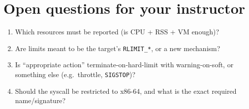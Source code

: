 \documentclass[11pt,a4paper]{article}
\begin{document}
\section*{Open questions for your instructor}
\begin{enumerate}
  \item Which resources must be reported (is CPU + RSS + VM enough)?
  \item Are limits meant to be the target's \texttt{RLIMIT\_*}, or a new mechanism?
  \item Is ``appropriate action'' terminate-on-hard-limit with warning-on-soft, or something else (e.g.\ throttle, \texttt{SIGSTOP})?
  \item Should the syscall be restricted to x86-64, and what is the exact required name/signature?
\end{enumerate}
\end{document}
